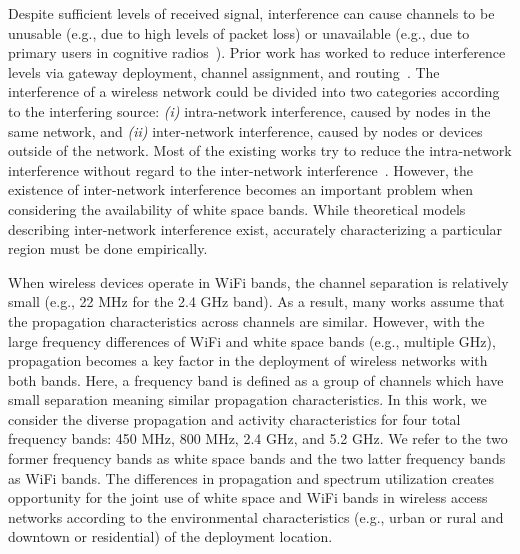 Despite sufficient levels of received signal, interference can cause channels
to be unusable (e.g., due to high levels of packet loss) or unavailable (e.g., 
due to primary users in cognitive radios~\cite{haykin2005cognitive}).
Prior work has worked to reduce interference levels via gateway deployment,
channel assignment, and routing~\cite{he2008optimizing,tang2005interference}.
The interference of a wireless network could be divided into two categories
according to the interfering source: {\it (i)} intra-network interference,
caused by nodes in the same network, and {\it (ii)} inter-network interference,
caused by nodes or devices outside of the network. Most of the existing works
try to reduce the intra-network interference without regard to the inter-network 
interference~\cite{si2010overview}. However, the existence of inter-network 
interference becomes an important problem when considering the availability
of white space bands.  While theoretical models describing inter-network 
interference exist, accurately characterizing a particular region must be done empirically.

When wireless devices operate in WiFi bands, the channel separation is relatively 
small (e.g., 22 MHz for the 2.4 GHz band). As a result, many works assume that
the propagation characteristics across channels are similar. However, with the
large frequency differences of WiFi and white space bands (e.g., multiple GHz),
propagation becomes a key factor in the deployment of wireless networks with both bands.
Here, a frequency band is defined as a group of channels which have
small separation meaning similar propagation characteristics.
In this work, we consider the diverse propagation and activity characteristics
for four total frequency bands: 450 MHz, 800 MHz, 2.4 GHz, and 5.2 GHz.
We refer to the two former frequency bands as white space bands and
the two latter frequency bands as WiFi bands.
The differences in propagation and spectrum utilization creates opportunity
for the joint use of white space and WiFi bands in wireless access networks according
to the environmental characteristics (e.g., urban or rural and downtown or residential)
of the deployment location.

